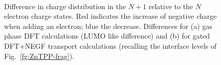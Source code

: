 \documentclass[aip,jcp,a4paper,reprint,floatfix,superscriptaddress]{revtex4-1}
\begin{document}
\begin{figure}
 \\
\caption{Difference in charge distribution in the $N+1$ relative to the $N$ electron charge states. Red indicates the increase of negative charge when adding an electron; blue the decrease. Differences for (a) gas phase DFT calculations (LUMO like difference) and (b) for gated DFT+NEGF transport calculations (recalling the interface levels of Fig.~\ref{fg:ZnTPP-frag}).} \label{fg:NNpm1-charges}
\end{figure}







\end{document}
